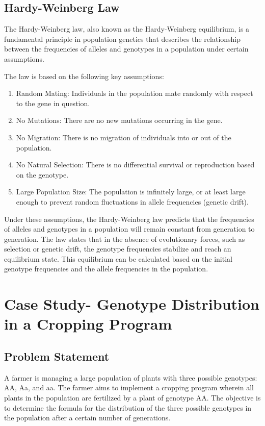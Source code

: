 \documentclass[a4paper,12pt]{article}
\begin{document}
\subsection{Hardy-Weinberg Law}
The Hardy-Weinberg law, also known as the Hardy-Weinberg equilibrium, is a fundamental principle in population genetics that describes the relationship between the frequencies of alleles and genotypes in a population under certain assumptions.

The law is based on the following key assumptions:
\begin{enumerate}
  \item Random Mating: Individuals in the population mate randomly with respect to the gene in question.
  \item No Mutations: There are no new mutations occurring in the gene.
  \item No Migration: There is no migration of individuals into or out of the population.
  \item No Natural Selection: There is no differential survival or reproduction based on the genotype.
  \item Large Population Size: The population is infinitely large, or at least large enough to prevent random fluctuations in allele frequencies (genetic drift).
\end{enumerate}

Under these assumptions, the Hardy-Weinberg law predicts that the frequencies of alleles and genotypes in a population will remain constant from generation to generation. The law states that in the absence of evolutionary forces, such as selection or genetic drift, the genotype frequencies stabilize and reach an equilibrium state. This equilibrium can be calculated based on the initial genotype frequencies and the allele frequencies in the population.
\section{Case Study- Genotype Distribution in a Cropping Program}
\subsection{Problem Statement}
A farmer is managing a large population of plants with three possible genotypes: AA, Aa, and aa. The farmer aims to implement a cropping program wherein all plants in the population are fertilized by a plant of genotype AA. The objective is to determine the formula for the distribution of the three possible genotypes in the population after a certain number of generations.
\end{document}
